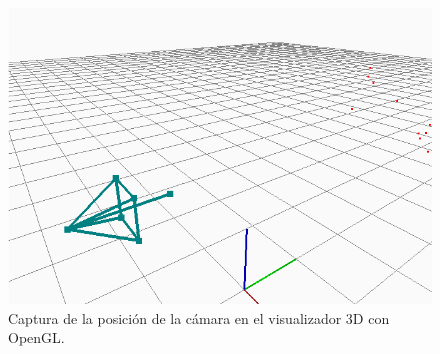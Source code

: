 \begin{figure}[th]
\centering
\includegraphics[scale=0.65]{Figures/camera-opengl.png}
\decoRule
\caption[opengl]{Captura de la posición de la cámara en el visualizador 3D con OpenGL.}
\label{fig:OpenGL}
\end{figure}